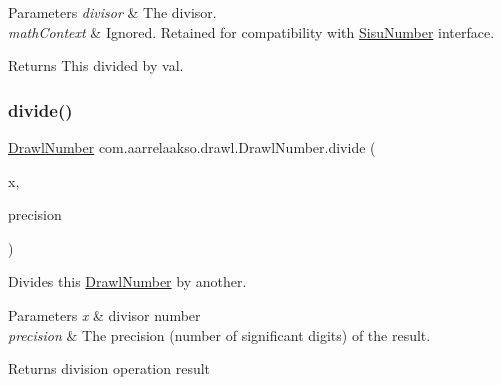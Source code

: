 \begin{DoxyParams}{Parameters}
{\em divisor} & The divisor. \\
\hline
{\em math\+Context} & Ignored. Retained for compatibility with \hyperlink{classcom_1_1aarrelaakso_1_1drawl_1_1_sisu_number}{Sisu\+Number} interface. \\
\hline
\end{DoxyParams}
\begin{DoxyReturn}{Returns}
This divided by val. 
\end{DoxyReturn}
\mbox{\label{classcom_1_1aarrelaakso_1_1drawl_1_1_drawl_number_ae3f1338acaa167edcc345c7be3a48aec}} 
\subsubsection{\texorpdfstring{divide()}{divide()}\hspace{0.1cm}{\footnotesize\ttfamily [2/3]}}
{\footnotesize\ttfamily \hyperlink{classcom_1_1aarrelaakso_1_1drawl_1_1_drawl_number}{Drawl\+Number} com.\+aarrelaakso.\+drawl.\+Drawl\+Number.\+divide (\begin{DoxyParamCaption}\item[{@Not\+Null \hyperlink{classcom_1_1aarrelaakso_1_1drawl_1_1_drawl_number}{Drawl\+Number}}]{x,  }\item[{int}]{precision }\end{DoxyParamCaption})\hspace{0.3cm}{\ttfamily [protected]}}



Divides this \hyperlink{classcom_1_1aarrelaakso_1_1drawl_1_1_drawl_number}{Drawl\+Number} by another. 


\begin{DoxyParams}{Parameters}
{\em x} & divisor number \\
\hline
{\em precision} & The precision (number of significant digits) of the result. \\
\hline
\end{DoxyParams}
\begin{DoxyReturn}{Returns}
division operation result 
\end{DoxyReturn}
\mbox{\label{classcom_1_1aarrelaakso_1_1drawl_1_1_drawl_number_aaefd2f03c90250ae78a0baaea1c468d4}} 
